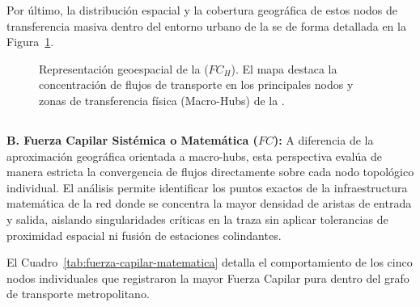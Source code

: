 Por último, la distribución espacial y la cobertura geográfica de estos nodos de
transferencia masiva dentro del entorno urbano de la \zmvm{} se \DIFdelbegin {}\DIFdelend \DIFaddbegin {}\DIFaddend de forma detallada en la Figura~\ref{fig:mapa-fuerza-capilar}.

\begin{figure}[H]
    \centering
    \caption[Mapa de Macro-Hubs y Fuerza Capilar Geográfica]{
    Representación geoespacial de la 
    ($FC_H$). El mapa destaca la concentración de flujos de transporte en los
    principales nodos y zonas de transferencia física (Macro-Hubs) de la \zmvm.}
    \label{fig:mapa-fuerza-capilar}
\end{figure}

\subsection{}
\label{subsec:fuerza-capilar-matematica}

\textbf{B. Fuerza Capilar Sistémica o Matemática ($FC$):} A diferencia de la
aproximación geográfica orientada a macro-hubs, esta perspectiva evalúa de manera
estricta la convergencia de flujos directamente sobre cada nodo topológico
individual. El análisis permite identificar los puntos exactos de la
infraestructura matemática de la red donde se concentra la mayor densidad de
aristas de entrada y salida, aislando singularidades críticas en la traza sin
aplicar tolerancias de proximidad espacial ni fusión de estaciones colindantes.

El Cuadro~\ref{tab:fuerza-capilar-matematica} detalla el comportamiento de los
cinco nodos individuales que registraron la mayor Fuerza Capilar pura dentro del
grafo de transporte metropolitano.

